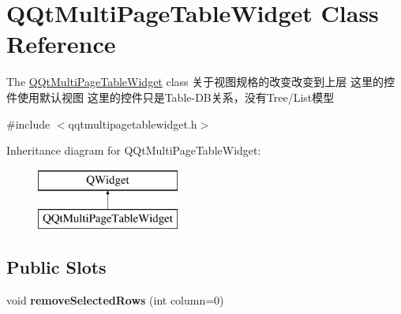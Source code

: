 \hypertarget{class_q_qt_multi_page_table_widget}{}\section{Q\+Qt\+Multi\+Page\+Table\+Widget Class Reference}
\label{class_q_qt_multi_page_table_widget}


The \mbox{\hyperlink{class_q_qt_multi_page_table_widget}{Q\+Qt\+Multi\+Page\+Table\+Widget}} class 关于视图规格的改变改变到上层 这里的控件使用默认视图 这里的控件只是\+Table-\/\+D\+B关系，没有\+Tree/\+List模型  




{\ttfamily \#include $<$qqtmultipagetablewidget.\+h$>$}

Inheritance diagram for Q\+Qt\+Multi\+Page\+Table\+Widget\+:\begin{figure}[H]
\begin{center}
\leavevmode
\includegraphics[height=2.000000cm]{class_q_qt_multi_page_table_widget}
\end{center}
\end{figure}
\subsection*{Public Slots}
\begin{DoxyCompactItemize}
\item 
\mbox{\label{class_q_qt_multi_page_table_widget_ae7bf13e587b5aa8597c85d24a42cdee3}} 
void {\bfseries remove\+Selected\+Rows} (int column=0)
\end{DoxyCompactItemize}
